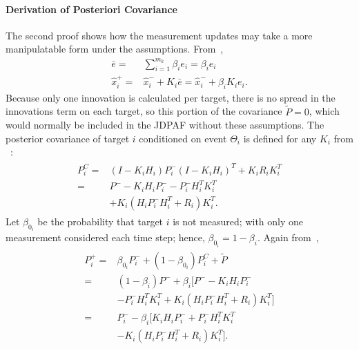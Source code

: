 \documentclass[letterpaper, 10pt, conference]{ieeeconf}
\begin{document}
\begin{appendix}
\paragraph{Derivation of Posteriori Covariance}

The second proof shows how the measurement updates may take a more manipulatable form under the assumptions. From~\cite[Section 6.4]{TrackDataAssoc},
\begin{align}
\bar e=&\displaystyle\sum\limits_{i=1}^{m_k}\beta_ie_i=\beta_ie_i\\
\hat x^+_i=&\hat x^-_i+K_i\bar e=\hat x^-_i+\beta_iK_ie_i.
\end{align}
Because only one innovation is calculated per target, there is no spread in the innovations term on each target, so this portion of the covariance $\tilde{P}=0$, which would normally be included in the JDPAF without these assumptions. The posterior covariance of target $i$ conditioned on event $\Theta_i$ is defined for any $K_i$ from ~\cite[Section 4.2]{OptEst1}:
\begin{align}
\begin{split}
P_{i}^C=&(I-K_{i}H_{i})P_{i}^{-}(I-K_{i}H_{i})^T+K_{i}R_{i}K_{i}^T\\
=&P^--K_{i}H_{i}P_{i}^{-}-P_{i}^{-}H_{i}^TK_{i}^T\\
&+K_{i}(H_{i}P_{i}^{-}H_{i}^T+R_i)K_{i}^T.
\end{split}
\end{align}
Let $\beta_{0_i}$ be the probability that target $i$ is not measured; with only one measurement considered each time step; hence, $\beta_{0_i}=1-\beta_i$. Again from~\cite[Section 6.4]{TrackDataAssoc},
\begin{align}
\begin{split}
P^+_i=&\beta_{0_i}P^-_i+(1-\beta_{0_i})P_i^C+\tilde{P}\\
=&(1-\beta_i)P^-+\beta_i[P^--K_{i}H_{i}P_{i}^{-}\\
&-P_{i}^{-}H_{i}^TK_{i}^T+K_{i}(H_{i}P_{i}^{-}H_{i}^T+R_i)K_{i}^T]\\
=&P^-_i-\beta_i[K_{i}H_{i}P_{i}^{-}+P_{i}^{-}H_{i}^TK_{i}^T\\
&-K_{i}(H_{i}P_{i}^{-}H_{i}^T+R_i)K_{i}^T].
\end{split}
\end{align}

\end{appendix}




\end{document}
